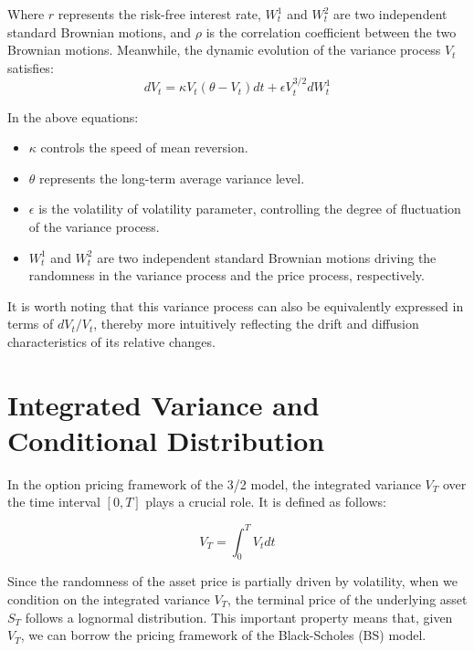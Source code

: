 Where $r$ represents the risk-free interest rate, $W_t^1$ and $W_t^2$ are two independent standard Brownian motions, and $\rho$ is the correlation coefficient between the two Brownian motions. Meanwhile, the dynamic evolution of the variance process $V_t$ satisfies:
\begin{equation}
    dV_t = \kappa V_t (\theta - V_t) dt + \epsilon V_t^{3/2} dW_t^1
    \label{eq:varianceProcess}
\end{equation}

In the above equations:

\begin{itemize}
    \item $\kappa$ controls the speed of mean reversion.
    \item $\theta$ represents the long-term average variance level.
    \item $\epsilon$ is the volatility of volatility parameter, controlling the degree of fluctuation of the variance process.
    \item $W_t^1$ and $W_t^2$ are two independent standard Brownian motions driving the randomness in the variance process and the price process, respectively.
\end{itemize}

It is worth noting that this variance process can also be equivalently expressed in terms of $dV_t/V_t$, thereby more intuitively reflecting the drift and diffusion characteristics of its relative changes.

\section{Integrated Variance and Conditional Distribution}

In the option pricing framework of the 3/2 model, the integrated variance $V_T$ over the time interval $[0, T]$ plays a crucial role. It is defined as follows:

\begin{equation}
    V_T = \int_0^T V_t dt
    \label{integratedVarianceDefinition}
\end{equation}

Since the randomness of the asset price is partially driven by volatility, when we condition on the integrated variance $V_T$, the terminal price of the underlying asset $S_T$ follows a lognormal distribution. This important property means that, given $V_T$, we can borrow the pricing framework of the Black-Scholes (BS) model.

